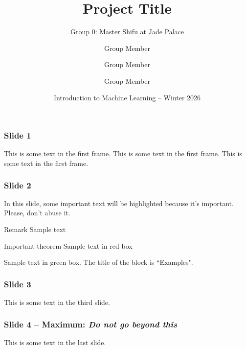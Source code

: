 \documentclass{beamer}
\title[Title]
{Project Title}
\subtitle{Group 0: Master Shifu at Jade Palace}
\author[Group 0: Master Shifu at Jade Palace] 
{Group Member\inst{1} \and Group Member\inst{2} \and Group Member\inst{3}}
\institute[ ] %
{
  \inst{1}%
  Department
  \and
  \inst{2}%
  Department
  \and
   \inst{3}%
  Department
}
\date[IntroML] %
{Introduction to Machine Learning -- Winter 2026}
\begin{document}
\frame{\titlepage}


\begin{frame}
\frametitle{Slide 1}
This is some text in the first frame. This is some text in the first frame. This is some text in the first frame.
\end{frame}


\begin{frame}
\frametitle{Slide 2}

In this slide, some important text will be
\alert{highlighted} because it's important.
Please, don't abuse it.

\begin{block}{Remark}
Sample text
\end{block}

\begin{alertblock}{Important theorem}
Sample text in red box
\end{alertblock}

\begin{examples}
Sample text in green box. The title of the block is ``Examples".
\end{examples}
\end{frame}

\begin{frame}
	\frametitle{Slide 3}
	This is some text in the third slide.
\end{frame}

\begin{frame}
	\frametitle{Slide 4 -- Maximum: \textit{Do not go beyond this}}
	This is some text in the last slide.
\end{frame}
\end{document}
